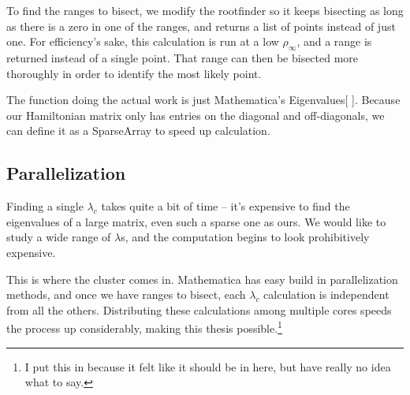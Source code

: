 \documentclass[12pt,twoside]{reedthesis}
\begin{document}
To find the ranges to bisect, we modify the rootfinder so it keeps bisecting as long as there is a zero in one of the ranges, and returns a list of points instead of just one. For efficiency's sake, this calculation is run at a low $\rho_{\infty}$, and a range is returned instead of a single point. That range can then be bisected more thoroughly in order to identify the most likely point. 

The function doing the actual work is just Mathematica's Eigenvalues[ ]. Because our Hamiltonian matrix only has entries on the diagonal and off-diagonals, we can define it as a SparseArray to speed up calculation. 

\subsection{Parallelization}

Finding a single $\lambda_{c}$ takes quite a bit of time -- it's expensive to find the eigenvalues of a large matrix, even such a sparse one as ours. We would like to study a wide range of $\lambda$s, and the computation begins to look prohibitively expensive.

This is where the cluster comes in. Mathematica has easy build in parallelization methods, and once we have ranges to bisect, each $\lambda_{c}$ calculation is independent from all the others. Distributing these calculations among multiple cores speeds the process up considerably, making this thesis possible.\footnote{I put this in because it felt like it should be in here, but have really no idea what to say.}


%
%
%
\backmatter %
%

 
  
%
   \nocite{*}
   

\end{document}
